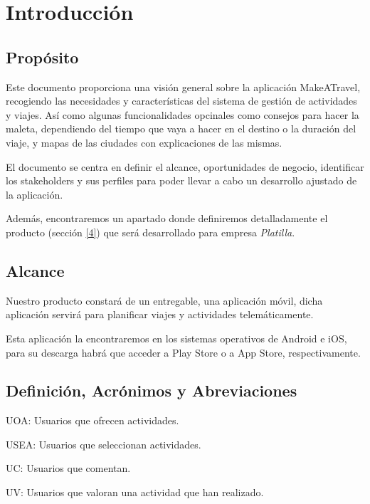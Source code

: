 \documentclass[11pt]{article}
\begin{document}
\tableofcontents
\newpage

\section{Introducción}
\subsection{Propósito}
Este documento proporciona una visión general sobre la aplicación MakeATravel, recogiendo las necesidades y características del sistema de gestión de actividades y viajes. Así como algunas funcionalidades opcinales como consejos para hacer la maleta, dependiendo del tiempo que vaya a hacer en el destino o la duración del viaje, y mapas de las ciudades con explicaciones de las mismas.

El documento se centra en definir el alcance, oportunidades de negocio, identificar los stakeholders y sus perfiles para poder llevar a cabo un desarrollo ajustado de la aplicación.

Además, encontraremos un apartado donde definiremos detalladamente el producto (sección \ref{4}) que será desarrollado para empresa \textit{Platilla}.


\subsection{Alcance}
Nuestro producto constará de un entregable, una aplicación móvil, dicha aplicación servirá para planificar viajes y actividades telemáticamente.

Esta aplicación la encontraremos en los sistemas operativos de Android e iOS, para su descarga habrá que acceder a Play Store o a App Store, respectivamente. 

\subsection{Definición, Acrónimos y Abreviaciones}

UOA: Usuarios que ofrecen actividades.

USEA: Usuarios que seleccionan actividades.

UC: Usuarios que comentan.

UV: Usuarios que valoran una actividad que han realizado.
\end{document}
